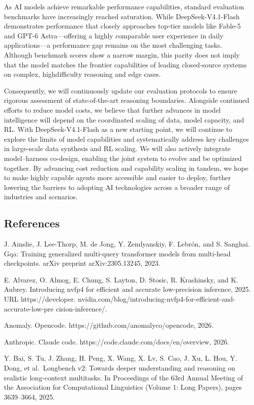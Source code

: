 \documentclass[
  10
]{article}
\begin{document}
As AI models achieve remarkable performance capabilities, standard
evaluation benchmarks have increasingly reached saturation. While
DeepSeek-V4.1-Flash demonstrates performance that closely approaches
top-tier models like Fable-5 and GPT-6 Astra---offering a highly
comparable user experience in daily applications---a performance gap
remains on the most challenging tasks. Although benchmark scores show a
narrow margin, this parity does not imply that the model matches the
frontier capabilities of leading closed-source systems on complex,
highdifficulty reasoning and edge cases.

Consequently, we will continuously update our evaluation protocols to
ensure rigorous assessment of state-of-the-art reasoning boundaries.
Alongside continued efforts to reduce model costs, we believe that
further advances in model intelligence will depend on the coordinated
scaling of data, model capacity, and RL. With DeepSeek-V4.1-Flash as a
new starting point, we will continue to explore the limits of model
capabilities and systematically address key challenges in large-scale
data synthesis and RL scaling. We will also actively integrate
model--harness co-design, enabling the joint system to evolve and be
optimized together. By advancing cost reduction and capability scaling
in tandem, we hope to make highly capable agents more accessible and
easier to deploy, further lowering the barriers to adopting AI
technologies across a broader range of industries and scenarios.

\subsection{References}\label{references}

J. Ainslie, J. Lee-Thorp, M. de Jong, Y. Zemlyanskiy, F. Lebrón, and S.
Sanghai. Gqa: Training generalized multi-query transformer models from
multi-head checkpoints. arXiv preprint arXiv:2305.13245, 2023.

E. Alvarez, O. Almog, E. Chung, S. Layton, D. Stosic, R. Krashinsky, and
K. Aubrey. Introducing nvfp4 for efficient and accurate low-precision
inference, 2025. URL https://developer.
nvidia.com/blog/introducing-nvfp4-for-efficient-and-accurate-low-pre
cision-inference/.

Anomaly. Opencode. https://github.com/anomalyco/opencode, 2026.

Anthropic. Claude code. https://code.claude.com/docs/en/overview, 2026.

Y. Bai, S. Tu, J. Zhang, H. Peng, X. Wang, X. Lv, S. Cao, J. Xu, L. Hou,
Y. Dong, et al.~Longbench v2: Towards deeper understanding and reasoning
on realistic long-context multitasks. In Proceedings of the 63rd Annual
Meeting of the Association for Computational Linguistics (Volume 1: Long
Papers), pages 3639--3664, 2025.
\end{document}
